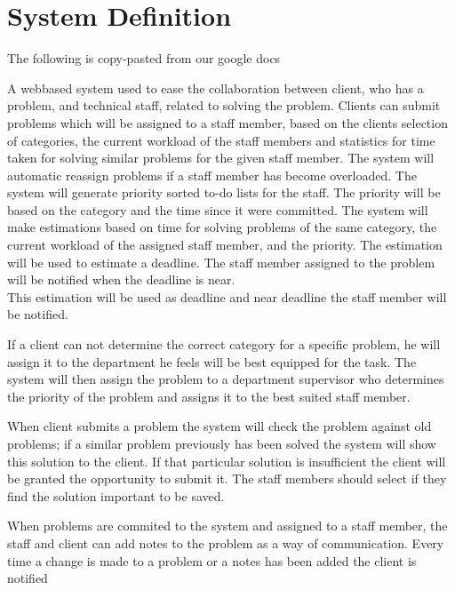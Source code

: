 \section{System Definition}
\label{sec:systemdefinition}

The following is copy-pasted from our google docs

A webbased system used to ease the collaboration between client, who has a problem, and technical staff, related to solving the problem. 
Clients can submit problems which will be assigned to a staff member, based on the clients selection of categories, the current workload of the staff members and statistics for time taken for solving similar problems for the given staff member. 
The system will automatic reassign problems if a staff member has become overloaded.
The system will generate priority sorted to-do lists for the staff. The priority will be based on the category and the time since it were committed.
The system will make estimations based on time for solving problems of the same category, the current workload of the assigned staff member, and the priority. The estimation will be used to estimate a deadline. The staff member assigned to the problem will be notified when the deadline is near.\\

This estimation will be used as deadline and near deadline the staff member will be notified.

If a client can not determine the correct category for a specific problem, he will assign it to the department he feels will be best equipped for the task. The system will then assign the problem to a department supervisor who determines the priority of the problem and assigns it to the best suited staff member. 

When client submits a problem the system will check the problem against old problems; if a similar problem previously has been solved the system will show this solution to the client. If that particular solution is insufficient the client will be granted the opportunity to submit it. The staff members should select if they find the solution important to be saved.

When problems are commited to the system and assigned to a staff member, the staff and client can add notes to the problem as a way of communication. Every time a change is made to a problem or a notes has been added the client is notified\\




